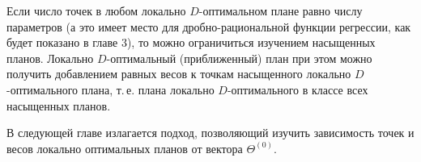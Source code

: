 Если число точек в любом локально $D$-оптимальном плане равно числу
параметров (а это имеет место для дробно-рациональной функции
регрессии, как будет показано в главе 3), то можно ограничиться
изучением насыщенных планов. Локально $D$-оптимальный (приближенный)
план при этом можно получить
 добавлением равных весов к точкам
насыщенного локально $D$-оптимального плана, т.\,е. плана локально
$D$-оптимального в классе всех насыщенных планов.

В следующей главе излагается подход, позволяющий изучить зависимость
точек и весов локально оптимальных планов от вектора $\Theta^{(0)}$.
